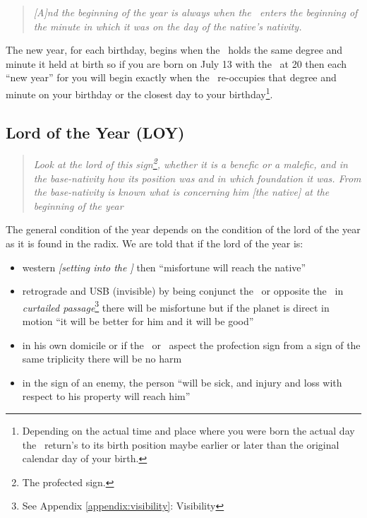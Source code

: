 \begin{quote}
\textsl{[A]nd the beginning of the year is always when the \Sun\, enters the beginning of the minute in which it was on the day of the native's nativity.}
\end{quote}

The new year, for each birthday, begins when the \Sun\, holds the same degree and minute it held at birth so if you are born on July 13 with the \Sun\, at 20 then each ``new year'' for you will begin exactly when the \Sun\, re-occupies that degree and minute on your birthday or the closest day to your birthday\footnote{Depending on the actual time and place where you were born the actual day the \Sun\, return's to its birth position maybe earlier or later than the original calendar day of your birth.}.

\subsection{Lord of the Year (LOY)}
\begin{quote}
\textsl{Look at the lord of this sign\footnote{The profected sign.}, whether it is a benefic or a malefic, and in the base-nativity how its position was and in which foundation it was. From the base-nativity is known what is concerning him [the native] at the beginning of the year}
\end{quote}

The general condition of the year depends on the condition of the lord of the year as it is found in the radix. We are told that if the lord of the year is:
\begin{itemize}[topsep=0em,itemsep=0em]
\item {}western \textsl{[setting into the \Sun]} then ``misfortune will reach the native''

\item {}retrograde and USB (invisible) by being conjunct the \Sun\, or opposite the \Sun\, in \textsl{curtailed passage}\footnote{See Appendix \ref{appendix:visibility}{: Visibility}} there will be misfortune but if the planet is direct in motion ``it will be better for him and it will be good''

\item {}in his own domicile or if the \Sun\, or \Moon\, aspect the profection sign from a sign of the same triplicity there will be no harm

\item {}in the sign of an enemy, the person ``will be sick, and injury and loss with respect to his property will reach him''
\end{itemize}

